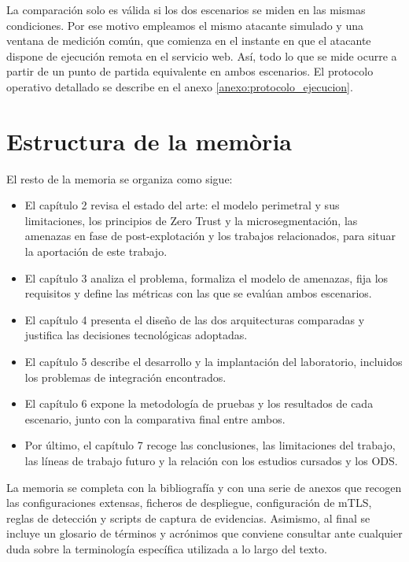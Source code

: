 \documentclass[11pt,spanish,listoffigures,listoftables]{tfgetsinf}
\begin{document}
    La comparación solo es válida si los dos escenarios se miden en las mismas condiciones. Por ese motivo empleamos el mismo atacante simulado y una ventana de medición común, que comienza en el instante en que el atacante dispone de ejecución remota en el servicio web. Así, todo lo que se mide ocurre a partir de un punto de partida equivalente en ambos escenarios. El protocolo operativo detallado se describe en el anexo \ref{anexo:protocolo_ejecucion}.  
    
    \section{Estructura de la mem\`oria}
    El resto de la memoria se organiza como sigue:
    \begin{itemize}
        \item El capítulo 2 revisa el estado del arte: el modelo perimetral y sus limitaciones, los principios de Zero Trust y la microsegmentación, las amenazas en fase de post-explotación y los trabajos relacionados, para situar la aportación de este trabajo.
        \item El capítulo 3 analiza el problema, formaliza el modelo de amenazas, fija los requisitos y define las métricas con las que se evalúan ambos escenarios.
        \item El capítulo 4 presenta el diseño de las dos arquitecturas comparadas y justifica las decisiones tecnológicas adoptadas.
        \item El capítulo 5 describe el desarrollo y la implantación del laboratorio, incluidos los problemas de integración encontrados.
        \item El capítulo 6 expone la metodología de pruebas y los resultados de cada escenario, junto con la comparativa final entre ambos.
        \item Por último, el capítulo 7 recoge las conclusiones, las limitaciones del trabajo, las líneas de trabajo futuro y la relación con los estudios cursados y los ODS.
    \end{itemize}

    La memoria se completa con la bibliografía y con una serie de anexos que recogen las configuraciones extensas, ficheros de despliegue, configuración de mTLS, reglas de detección y scripts de captura de evidencias. Asimismo, al final se incluye un glosario de términos y acrónimos que conviene consultar ante cualquier duda sobre la terminología específica utilizada a lo largo del texto.
\end{document}

